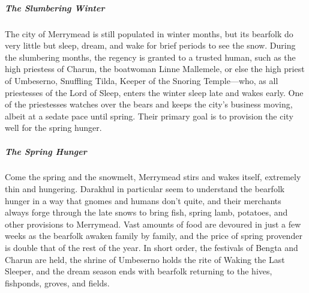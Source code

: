 \documentclass[10pt,a4paper,twoside,bg=print,twocolumn,openany,nodeprecatedcode]{dndbook}
\begin{document}
\subparagraph{The Slumbering Winter}
The city of Merrymead is still populated in winter months, but its bearfolk do very little but sleep, dream, and wake for brief periods to see the snow. During the slumbering months, the regency is granted to a trusted human, such as the high priestess of Charun, the boatwoman Linne Mallemele, or else the high priest of Umbeserno, Snuffling Tilda, Keeper of the Snoring Temple—who, as all priestesses of the Lord of Sleep, enters the winter sleep late and wakes early. One of the priestesses watches over the bears and keeps the city's business moving, albeit at a sedate pace until spring. Their primary goal is to provision the city well for the spring hunger.

\subparagraph{The Spring Hunger}
Come the spring and the snowmelt, Merrymead stirs and wakes itself, extremely thin and hungering. Darakhul in particular seem to understand the bearfolk hunger in a way that gnomes and humans don't quite, and their merchants always forge through the late snows to bring fish, spring lamb, potatoes, and other provisions to Merrymead. Vast amounts of food are devoured in just a few weeks as the bearfolk awaken family by family, and the price of spring provender is double that of the rest of the year. In short order, the festivals of Bengta and Charun are held, the shrine of Umbeserno holds the rite of Waking the Last Sleeper, and the dream season ends with bearfolk returning to the hives, fishponds, groves, and fields.
\end{document}
